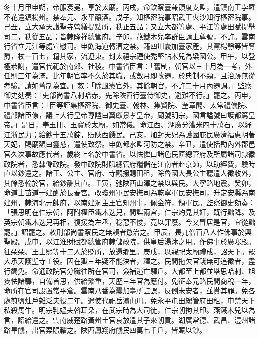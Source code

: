 \begin{pinyinscope}
 冬十月甲申朔，帝服袞冕，享於太廟。丙戌，命欽察臺兼領度支監，遣鎮南王孛羅不花還鎮楊州。禁奉元、永平釀酒。戊子，知樞密院事昭武王火沙知行樞密院事。己丑，立大承天護聖寺營繕提點所，秩正五品；又立大都等處、平江等處田賦提舉司二，秩從五品；皆隸隆祥總管府。辛卯，燕鐵木兒率群臣請上尊號，不許。雲南行省立元江等處宣慰司。申飭海道轉漕之禁。籍四川囊加臺家產，其黨楊靜等皆奪爵，杖一百七，籍其家，流遼東。封太禧宗禋使禿堅帖木兒為梁國公。甲午，以登極恭謝，遣官代祀於南郊、社稷。中書省臣言：「舊制，朝官以三十月為一考，外任則三年為滿。比年朝官率不久於其職，或數月即改遷，於典制不類，且治跡無從考驗。請如舊制為宜。」敕：「除風憲官外，其餘朝官，不許二十月內遷調。」監察御史劾奏：「吏部尚書八剌哈赤，先除陜西行臺侍御史，避難不行。」罷之。丙申，中書省臣言：「臣等謹集樞密院、御史臺、翰林、集賢院、奎章閣、太常禮儀院、禮部諸臣僚，議上大行皇帝尊謚曰翼獻景孝皇帝，廟號明宗，國言謚號曰護都篤皇帝。」是日，奉玉冊、玉寶於太廟，如常儀。命江西、湖廣分漕米四十萬石，以紓江浙民力；給鈔十五萬錠，賑陜西饑民。己亥，加封天妃為護國庇民廣濟福惠明著天妃，賜廟額曰靈慈，遣使致祭。申飭都水監河防之禁。辛丑，遣使括勘內外郡邑官久次事故應代者，歲終上名於中書省。以怯憐口諸色民匠總管府及所屬諸司隸徽政院者，悉隸儲政院。發中政院財賦總管府糧儲在江南者赴京師，以助經費，驗時直以鈔還之。諸王、公主、官府、寺觀撥賜田租，除魯國大長公主聽遣人徵收外，其餘悉輸於官，給鈔酬其直。壬寅，弛陜西山澤之禁以與民。大寧路地震。癸卯，命道士苗道一建醮於長春宮。改瓊州軍民安撫司為乾寧軍民安撫司，升定安縣為南建州，隸海北元帥府，以南建洞主王官知州事，佩金符，領軍民。監察御史劾奏：「張思明在仁宗朝，阿附權臣鐵木迭兒，間諜兩宮，仁宗灼見其奸，既行黜降。及英宗朝鐵木迭兒再相，復援為左丞，稔惡不悛，竟以罪廢。今又冒居是官，宜從黜罷。」詔罷之。敕刑部尚書察民之無賴者懲治之。甲辰，畏兀僧百八人作佛事於興聖殿。戊申，以江淮財賦都總管府隸儲政院，供皇后湯沐之用。作佛事於廣寒殿。征朵朵、王士熙等十二人於貶所，放還鄉里。庚戌，以親祀太廟禮成，詔天下。罷大承天護聖寺工役。囚在獄三年疑不能決者，釋之。民間拖欠官錢無可追徵者，盡行蠲免。命通政院官分職往所在官司，僉補逃亡驛戶。大都至上都並塔思哈剌、旭麥怯諸驛，自備首思，供給繁重，天歷三年官為應付。免征奉元路民間商稅一年，命所在官司設置常平倉。雲南八番為囊加臺所詿誤，反側未安者，並貰其罪。免各處煎鹽灶戶雜泛夫役二年。遣使代祀岳瀆山川。免永平屯田總管府田租，申禁天下私殺馬牛。明宗乳媼夫斡耳朵，在武宗時為大司徒，仁宗朝拘其印。燕鐵木兒以為言，詔給還之。雲南威楚路黃州土官哀放遣其子來朝貢。湖廣常德、武昌、澧州諸路旱饑，出官粟賑糶之。陜西鳳翔府饑民四萬七千戶，皆賑以鈔。




\end{pinyinscope}
